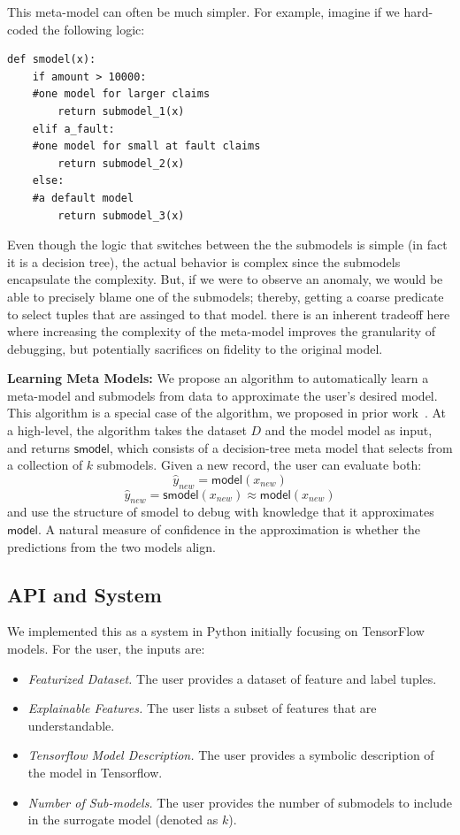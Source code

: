 This meta-model can often be much simpler.
For example, imagine if we hard-coded the following logic:
\begin{lstlisting}
def smodel(x):
    if amount > 10000:
    #one model for larger claims
        return submodel_1(x)
    elif a_fault:
    #one model for small at fault claims
        return submodel_2(x)
    else:
    #a default model
        return submodel_3(x)
\end{lstlisting}
Even though the logic that switches between the the submodels is simple (in fact it is a decision tree), the actual behavior is complex since the submodels encapsulate the complexity.
But, if we were to observe an anomaly, we would be able to precisely blame one of the submodels; thereby, getting a coarse predicate to select tuples that are assinged to that model.
there is an inherent tradeoff here where increasing the complexity of the meta-model improves the granularity of debugging, but potentially sacrifices on fidelity to the original model.

\vspace{0.25em} \noindent \textbf{Learning Meta Models: } We propose an algorithm to automatically learn a meta-model and submodels from data to approximate the user's desired model. This algorithm is a special case of the algorithm, we proposed in prior work~\cite{DBLP:journals/corr/KrishnanGLMPG16, Krishnan17}. At a high-level, the algorithm takes the dataset $D$ and the model \textsf{model} as input, and returns $\textsf{smodel}$, which consists of a decision-tree meta model that selects from a collection of $k$ submodels. Given a new record, the user can evaluate both:
\[
\hat{y}_{new} = \textsf{model}(x_{new})
\]
\[
\hat{y}_{new} = \textsf{smodel}(x_{new}) \approx \textsf{model}(x_{new})
\]
and use the structure of \textsf{smodel} to debug with knowledge that it approximates $\textsf{model}$. A natural measure of confidence in the approximation is whether the predictions from the two models align.

\subsection{API and System}
We implemented this as a system in Python initially focusing on TensorFlow models.
For the user, the inputs are:
\begin{itemize}
\item \emph{Featurized Dataset. } The user provides a dataset of feature and label tuples.

\item \emph{Explainable Features. } The user lists a subset of features that are understandable.

\item \emph{Tensorflow Model Description. } The user provides a symbolic description of the model in Tensorflow.

\item \emph{Number of Sub-models. } The user provides the number of submodels to include in the surrogate model (denoted as $k$).
\end{itemize}

